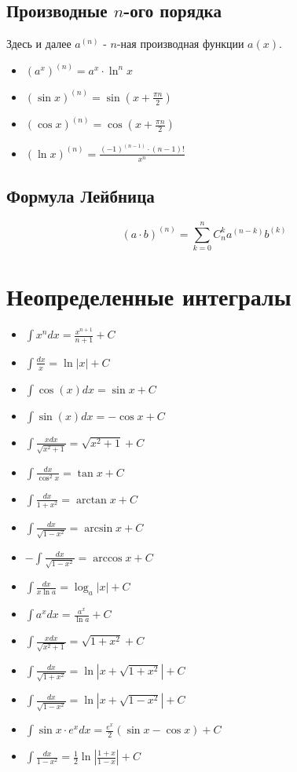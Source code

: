 \documentclass{article}
\begin{document}
	\subsection{Производные $n$-ого порядка}
	Здесь и далее $a^{(n)}$ - $n$-ная производная функции $a(x)$.
	\begin{itemize}
		\item $(a^x)^{(n)}=a^x \cdot \ln^n{x} $
		\item $(\sin{x})^{(n)}=\sin{(x+\frac{\pi n}{2})}$
		\item $(\cos{x})^{(n)}=\cos{(x+\frac{\pi n}{2})}$
		\item $(\ln{x})^{(n)}=\frac{(-1)^{(n-1)}\cdot (n-1)!}{x^n}$
	\end{itemize}
	\subsection{Формула Лейбница}
	$$(a\cdot b)^{(n)}=\sum_{k=0}^n C^k_na^{(n-k)}b^{(k)}$$
	
	\section{Неопределенные интегралы}
	\begin{itemize}
		\item $\int{x^ndx}=\frac{x^{n+1}}{n+1}+C$
		\item $\int \frac{dx}{x} = \ln{|x|} + C$
		\item $\int{\cos{(x)}}dx = \sin{x} + C$
		\item $\int{\sin{(x)}}dx = - \cos{x} + C$
		\item $\int{\frac{xdx}{\sqrt{x^2+1}}} = \sqrt{x^2+1}+C$
		\item $\int\frac{dx}{\cos^2{x}} = \tan{x} +C$
		\item $\int\frac{dx}{1+x^2}=\arctan{x} +C$
		\item $\int\frac{dx}{\sqrt{1-x^2}} = \arcsin x +C$
		\item $-\int\frac{dx}{\sqrt{1-x^2}} = \arccos x +C$
		\item $\int\frac{dx}{x\ln{a}} = \log_a{|x|}+C$                                                                                                     
		\item $\int a^x dx= \frac{a^x}{\ln{a}}+C$
		\item $\int\frac{x dx}{\sqrt{x^2+1}} = \sqrt{1+x^2}+C$
		\item $\int\frac{dx}{\sqrt{1+x^2}} = \ln|x+\sqrt{1+x^2}|+C$
		\item $\int\frac{dx}{\sqrt{1-x^2}} = \ln|x+\sqrt{1-x^2}|+C$
		\item $\int \sin{x}\cdot e^x dx = \frac{e^x}{2}(\sin{x} - \cos{x})+C$

		\item $\int\frac{dx}{1-x^2} = \frac{1}{2}\ln\left|\frac{1+x}{1-x}\right| + C $

	\end{itemize}

	
\end{document}
